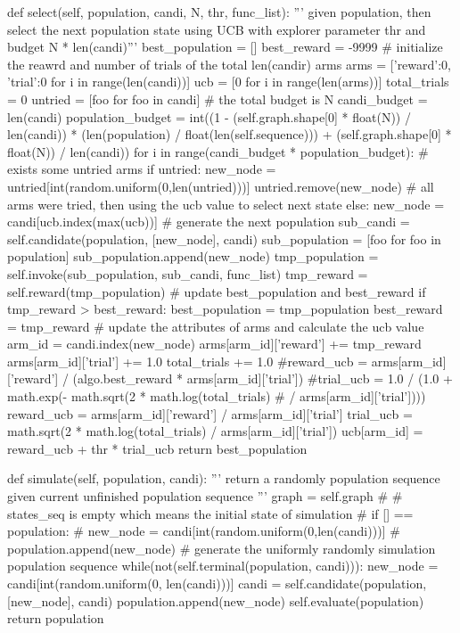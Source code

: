 \documentclass{article}
\begin{document}
\begin{python}[moreemph={[4]42},caption={A General Framework of MCTS based on Python},label=ex1]
    def select(self, population, candi, N, thr, func_list):
        ''' given population, then select the next population state using UCB with
        explorer parameter thr and budget N * len(candi)'''        
        best_population = []
        best_reward = -9999
        # initialize the reawrd and number of trials of the total len(candir) arms
        arms = [{'reward':0, 'trial':0} for i in range(len(candi))]
        ucb = [0 for i in range(len(arms))]
        total_trials = 0
        untried = [foo for foo in candi]
        # the total budget is N
        candi_budget = len(candi)
        population_budget = int((1 - (self.graph.shape[0] * float(N)) / len(candi)) *
              (len(population) / float(len(self.sequence))) +  (self.graph.shape[0] *
               float(N)) / len(candi))
        for i in range(candi_budget * population_budget):
            # exists some untried arms
            if untried:
                new_node = untried[int(random.uniform(0,len(untried)))]
                untried.remove(new_node)
            # all arms were tried, then using the ucb value to select next state
            else:
                new_node = candi[ucb.index(max(ucb))]
            # generate the next population
            sub_candi = self.candidate(population, [new_node], candi)
            sub_population = [foo for foo in population]
            sub_population.append(new_node)
            tmp_population = self.invoke(sub_population, sub_candi, func_list)
            tmp_reward = self.reward(tmp_population)
            # update best_population and best_reward
            if tmp_reward > best_reward:
                best_population = tmp_population
                best_reward = tmp_reward
            # update the attributes of arms and calculate the ucb value
            arm_id = candi.index(new_node)
            arms[arm_id]['reward'] += tmp_reward
            arms[arm_id]['trial'] += 1.0
            total_trials += 1.0
            #reward_ucb = arms[arm_id]['reward'] / (algo.best_reward * arms[arm_id]['trial'])
            #trial_ucb = 1.0 / (1.0 + math.exp(- math.sqrt(2 * math.log(total_trials)
                        # / arms[arm_id]['trial'])))
            reward_ucb = arms[arm_id]['reward'] / arms[arm_id]['trial']
            trial_ucb = math.sqrt(2 * math.log(total_trials) / arms[arm_id]['trial'])
            ucb[arm_id] = reward_ucb + thr * trial_ucb
        return best_population
        
    def simulate(self, population, candi):
        ''' return a randomly population sequence given current unfinished population
        sequence '''      
        graph = self.graph 
#        # states_seq is empty which means the initial state of simulation
#        if [] == population:
#            new_node = candi[int(random.uniform(0,len(candi)))]
#            population.append(new_node)
        # generate the uniformly randomly simulation population sequence
        while(not(self.terminal(population, candi))):
            new_node = candi[int(random.uniform(0, len(candi)))]
            candi = self.candidate(population, [new_node], candi)
            population.append(new_node)
        self.evaluate(population)       
        return population


\end{python}
\end{document}
